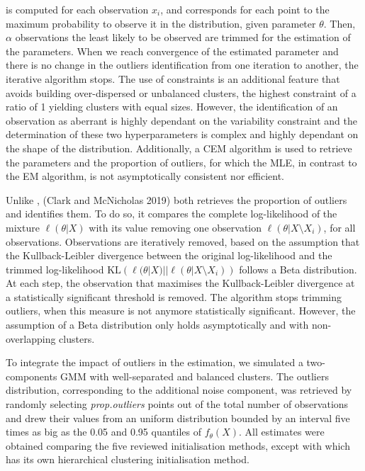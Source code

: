 is computed for each observation \(x_i\), and corresponds for each point
to the maximum probability to observe it in the distribution, given
parameter \(\theta\). Then, \(\alpha\) observations the least likely to be
observed are trimmed for the estimation of the parameters. When we reach
convergence of the estimated parameter and there is no change in the
outliers identification from one iteration to another, the iterative
algorithm stops. The use of constraints is an additional feature that
avoids building over-dispersed or unbalanced clusters, the highest
constraint of a ratio of 1 yielding clusters with equal sizes. However,
the identification of an observation as aberrant is highly dependant on
the variability constraint and the determination of these two
hyperparameters is complex and highly dependant on the shape of the
distribution. Additionally, a CEM algorithm is used to retrieve the
parameters and the proportion of outliers, for which the MLE, in
contrast to the EM algorithm, is not asymptotically consistent nor
efficient.

Unlike ,  (Clark and McNicholas 2019) both retrieves the
proportion of outliers and identifies them. To do so, it compares the
complete log-likelihood of the mixture \(\ell(\theta|X)\) with its value
removing one observation \(\ell(\theta | X \setminus X_i)\), for all
observations. Observations are iteratively removed, based on the
assumption that the Kullback-Leibler divergence between the original
log-likelihood and the trimmed log-likelihood
\(\text{KL}\left(\ell(\theta|X)|| \ell(\theta | X \setminus X_i)\right)\)
follows a Beta distribution. At each step, the observation that
maximises the Kullback-Leibler divergence at a statistically significant
threshold is removed. The algorithm stops trimming outliers, when this
measure is not anymore statistically significant. However, the
assumption of a Beta distribution only holds asymptotically and with
non-overlapping clusters.

To integrate the impact of outliers in the estimation, we simulated a
two-components GMM with well-separated and balanced clusters. The
outliers distribution, corresponding to the additional noise component,
was retrieved by randomly selecting \emph{prop.outliers} points out of the
total number of observations and drew their values from an uniform
distribution bounded by an interval five times as big as the 0.05 and
0.95 quantiles of \(f_\theta(X)\). All estimates were obtained comparing
the five reviewed initialisation methods, except with 
which has its own hierarchical clustering initialisation method.

